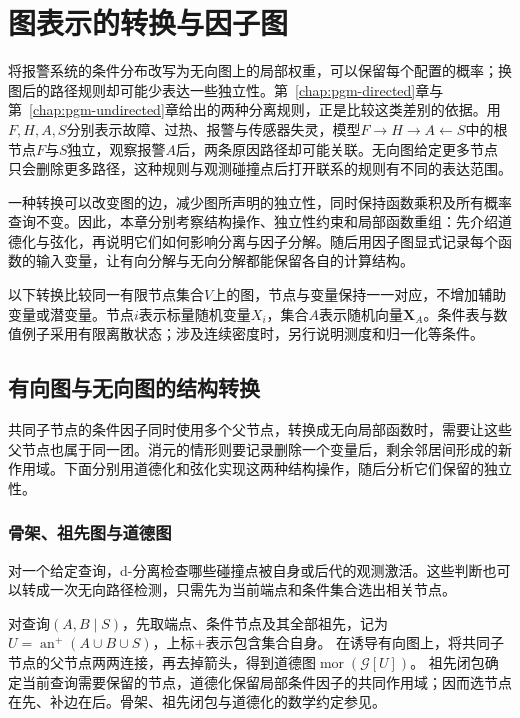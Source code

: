 \chapter{图表示的转换与因子图}
\label{chap:pgm-representations}

将报警系统的条件分布改写为无向图上的局部权重，可以保留每个配置的概率；换图后的路径规则却可能少表达一些独立性。第~\ref{chap:pgm-directed}章与第~\ref{chap:pgm-undirected}章给出的两种分离规则，正是比较这类差别的依据。用$F,H,A,S$分别表示故障、过热、报警与传感器失灵，模型$F\to H\to A\leftarrow S$中的根节点$F$与$S$独立，观察报警$A$后，两条原因路径却可能关联。无向图给定更多节点只会删除更多路径，这种规则与观测碰撞点后打开联系的规则有不同的表达范围。

一种转换可以改变图的边，减少图所声明的独立性，同时保持函数乘积及所有概率查询不变。因此，本章分别考察结构操作、独立性约束和局部函数重组：先介绍道德化与弦化，再说明它们如何影响分离与因子分解。随后用因子图显式记录每个函数的输入变量，让有向分解与无向分解都能保留各自的计算结构。

以下转换比较同一有限节点集合$V$上的图，节点与变量保持一一对应，不增加辅助变量或潜变量。节点$i$表示标量随机变量$X_i$，集合$A$表示随机向量$\bm{X}_A$。条件表与数值例子采用有限离散状态；涉及连续密度时，另行说明测度和归一化等条件。

\section{有向图与无向图的结构转换}
\label{sec:pgm-representations-structural-conversions}

共同子节点的条件因子同时使用多个父节点，转换成无向局部函数时，需要让这些父节点也属于同一团。消元的情形则要记录删除一个变量后，剩余邻居间形成的新作用域。下面分别用道德化和弦化实现这两种结构操作，随后分析它们保留的独立性。

\subsection{骨架、祖先图与道德图}
\label{sec:pgm-representations-ancestral-graphs}

对一个给定查询，d-分离检查哪些碰撞点被自身或后代的观测激活。这些判断也可以转成一次无向路径检测，只需先为当前端点和条件集合选出相关节点。

对查询$(A,B\mid S)$，先取端点、条件节点及其全部祖先，记为
$U=\operatorname{an}^{+}(A\cup B\cup S)$，上标$+$表示包含集合自身。
在诱导有向图上，将共同子节点的父节点两两连接，再去掉箭头，得到道德图$\operatorname{mor}(\mathcal G[U])$。
祖先闭包确定当前查询需要保留的节点，道德化保留局部条件因子的共同作用域；因而选节点在先、补边在后。骨架、祖先闭包与道德化的数学约定参见。

